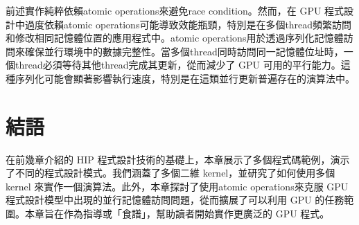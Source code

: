 \vspace{1em}
前述實作純粹依賴atomic operations來避免race condition。然而，在 GPU 程式設計中過度依賴atomic operations可能導致效能瓶頸，特別是在多個thread頻繁訪問和修改相同記憶體位置的應用程式中。atomic operations用於透過序列化記憶體訪問來確保並行環境中的數據完整性。當多個thread同時訪問同一記憶體位址時，一個thread必須等待其他thread完成其更新，從而減少了 GPU 可用的平行能力。這種序列化可能會顯著影響執行速度，特別是在這類並行更新普遍存在的演算法中。

\section{結語}
在前幾章介紹的 HIP 程式設計技術的基礎上，本章展示了多個程式碼範例，演示了不同的程式設計模式。我們涵蓋了多個二維 kernel，並研究了如何使用多個 kernel 來實作一個演算法。此外，本章探討了使用atomic operations來克服 GPU 程式設計模型中出現的並行記憶體訪問問題，從而擴展了可以利用 GPU 的任務範圍。本章旨在作為指導或「食譜」，幫助讀者開始實作更廣泛的 GPU 程式。